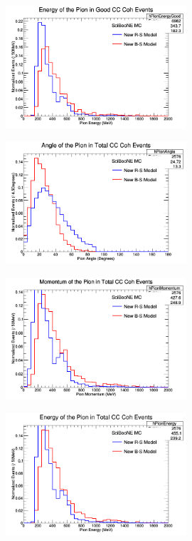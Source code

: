 \documentclass[11pt]{article}
\begin{document}
\begin{figure}[H]
\centering
\includegraphics[width=0.6\textwidth]{ANMPionPlottingImages/9-ANMPionPlotting.png}
\caption{}
\end{figure}

\begin{figure}[H]
\centering
\includegraphics[width=0.6\textwidth]{ANMPionPlottingImages/10-ANMPionPlotting.png}
\caption{}
\end{figure}

\begin{figure}[H]
\centering
\includegraphics[width=0.6\textwidth]{ANMPionPlottingImages/11-ANMPionPlotting.png}
\caption{}
\end{figure}

\begin{figure}[H]
\centering
\includegraphics[width=0.6\textwidth]{ANMPionPlottingImages/12-ANMPionPlotting.png}
\caption{}
\end{figure}
\end{document}
